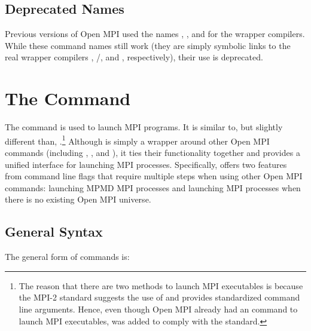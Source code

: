

\subsection{Deprecated Names}

Previous versions of Open MPI used the names ,
, and  for the wrapper compilers.  While
these command names still work (they are simply symbolic links to the
real wrapper compilers , /, and
, respectively), their use is deprecated.


\section{The  Command}
\label{sec:commands-mpiexec}

The  command is used to launch MPI programs.  It is
similar to, but slightly different than, .\footnote{The
  reason that there are two methods to launch MPI executables is
  because the MPI-2 standard suggests the use of  and
  provides standardized command line arguments.  Hence, even though
  Open MPI already had an  command to launch MPI executables,
   was added to comply with the standard.}  Although
 is simply a wrapper around other Open MPI commands (including
, , and ), it ties their
functionality together and provides a unified interface for launching
MPI processes. 
%
Specifically,  offers two features from command line
flags that require multiple steps when using other Open MPI commands:
launching MPMD MPI processes and launching MPI processes when there is
no existing Open MPI universe.


\subsection{General Syntax}

The general form of  commands is:

